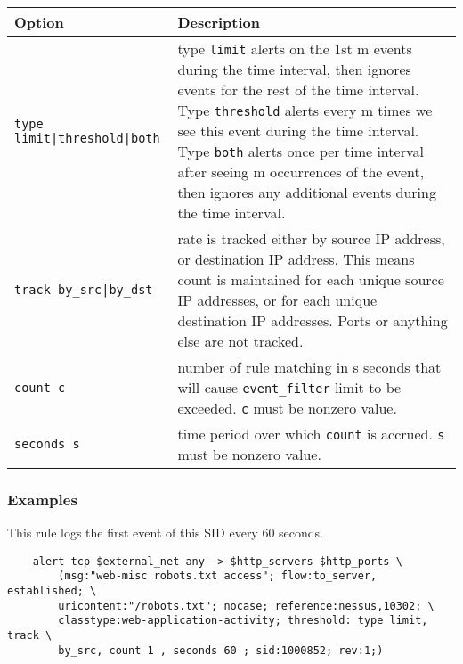 \documentclass[english]{report}
\begin{document}
\begin{table}[h]
\begin{center}
\begin{tabular}{| l | p{4.5in} |}

\hline
\textbf{Option} & \textbf{Description}\\
\hline

\hline
\texttt{type limit|threshold|both} &

type \texttt{limit} alerts on the 1st m events during the time interval, then
ignores events for the rest of the time interval.  Type \texttt{threshold}
alerts every m times we see this event during the time interval.  Type
\texttt{both} alerts once per time interval after seeing m occurrences of the
event, then ignores any additional events during the time interval.\\

\hline
\texttt{track by\_src|by\_dst} &

rate is tracked either by source IP address, or destination IP address.  This
means count is maintained for each unique source IP addresses, or for each
unique destination IP addresses.  Ports or anything else are not tracked.\\

\hline
\texttt{count c} &

number of rule matching in s seconds that will cause \texttt{event\_filter}
limit to be exceeded.  \texttt{c} must be nonzero value.\\

\hline
\texttt{seconds s} &

time period over which \texttt{count} is accrued.  \texttt{s} must be nonzero
value.\\

\hline
\end{tabular}
\end{center}
\end{table}

\subsubsection{Examples}

This rule logs the first event of this SID every 60 seconds.

\begin{verbatim}
    alert tcp $external_net any -> $http_servers $http_ports \
        (msg:"web-misc robots.txt access"; flow:to_server, established; \
        uricontent:"/robots.txt"; nocase; reference:nessus,10302; \
        classtype:web-application-activity; threshold: type limit, track \
        by_src, count 1 , seconds 60 ; sid:1000852; rev:1;)
\end{verbatim}
\end{document}
